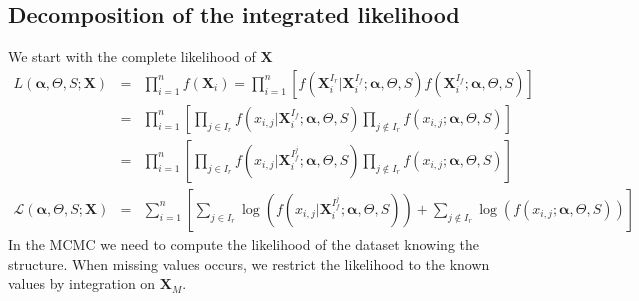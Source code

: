 \documentclass[11pt,a4paper]{report}
\begin{document}
	\subsection{Decomposition of the integrated likelihood}
We start with the complete likelihood of $\boldsymbol{X}$
\begin{eqnarray}
	L(\boldsymbol{\alpha},\Theta,S;\boldsymbol{X})&=& \prod_{i=1}^n f(\boldsymbol{X}_i)= \prod_{i=1}^n\left[f(\boldsymbol{X}_i^{I_r}|\boldsymbol{X}_i^{I_f};\boldsymbol{\alpha},\Theta,S)f(\boldsymbol{X}_i^{I_f};\boldsymbol{\alpha},\Theta,S) \right] \\
	&=&\prod_{i=1}^n\left[\prod_{j \in I_r}f(x_{i,j}|\boldsymbol{X}_i^{I_f};\boldsymbol{\alpha},\Theta,S)\prod_{j \notin I_r} f(x_{i,j};\boldsymbol{\alpha},\Theta,S) \right] \\
	&=&\prod_{i=1}^n\left[\prod_{j \in I_r}f(x_{i,j}|\boldsymbol{X}_i^{I_f^j};\boldsymbol{\alpha},\Theta,S)\prod_{j \notin I_r} f(x_{i,j};\boldsymbol{\alpha},\Theta,S) \right] \\
	\mathcal{L}(\boldsymbol{\alpha},\Theta,S;\boldsymbol{X})&=&\sum_{i=1}^n\left[\sum_{j \in I_r}\log \left(f(x_{i,j}|\boldsymbol{X}_i^{I_f^j};\boldsymbol{\alpha},\Theta,S)\right)+\sum_{j \notin I_r} \log \left(f(x_{i,j};\boldsymbol{\alpha},\Theta,S)\right) \right] \label{loglikmiss}
\end{eqnarray}
		In the MCMC we need to compute the likelihood of the dataset knowing the structure. When missing values occurs, we restrict the likelihood to the known values by integration on $\boldsymbol{X}_M$.
				 		
\end{document}

